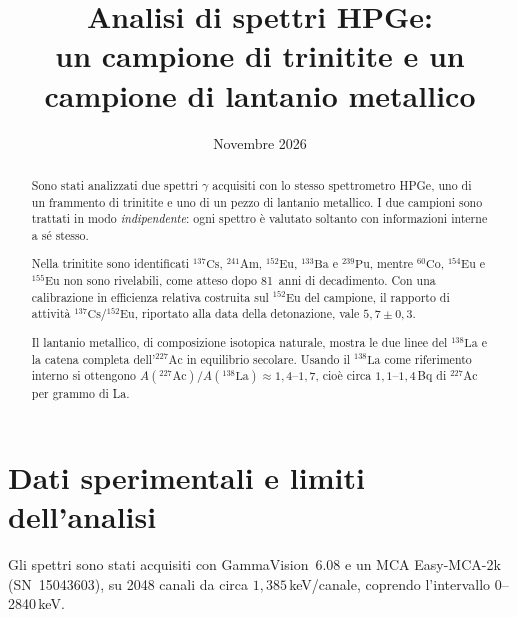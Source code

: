 \documentclass[11pt,a4paper]{article}
\title{Analisi di spettri \gam{} HPGe:\\ un campione di trinitite e un campione di lantanio metallico}
\author{}
\date{Novembre 2026}
\newcommand{\nuc}[2]{\ensuremath{{}^{#1}\mathrm{#2}}}
\newcommand{\gam}{$\gamma$}
\begin{document}
\maketitle

\begin{abstract}
\noindent
Sono stati analizzati due spettri \gam{} acquisiti con lo stesso spettrometro HPGe, uno di un frammento di trinitite e uno di un pezzo di lantanio metallico. I due campioni sono trattati in modo \emph{indipendente}: ogni spettro è valutato soltanto con informazioni interne a sé stesso.

Nella trinitite sono identificati \nuc{137}{Cs}, \nuc{241}{Am}, \nuc{152}{Eu}, \nuc{133}{Ba} e \nuc{239}{Pu}, mentre \nuc{60}{Co}, \nuc{154}{Eu} e \nuc{155}{Eu} non sono rivelabili, come atteso dopo 81~anni di decadimento. Con una calibrazione in efficienza relativa costruita sul \nuc{152}{Eu} del campione, il rapporto di attività \nuc{137}{Cs}/\nuc{152}{Eu}, riportato alla data della detonazione, vale $5{,}7\pm0{,}3$.

Il lantanio metallico, di composizione isotopica naturale, mostra le due linee del \nuc{138}{La} e la catena completa dell'\nuc{227}{Ac} in equilibrio secolare. Usando il \nuc{138}{La} come riferimento interno si ottengono $A(\nuc{227}{Ac})/A(\nuc{138}{La})\approx1{,}4$--$1{,}7$, cioè circa $1{,}1$--$1{,}4$\,Bq di \nuc{227}{Ac} per grammo di La.
\end{abstract}

\section{Dati sperimentali e limiti dell'analisi}

Gli spettri sono stati acquisiti con GammaVision~6.08 e un MCA Easy-MCA-2k (SN~15043603), su 2048 canali da circa $1{,}385$\,keV/canale, coprendo l'intervallo 0--2840\,keV.

\begin{table}[H]
\centering\small
{}
\end{table}
\end{document}
